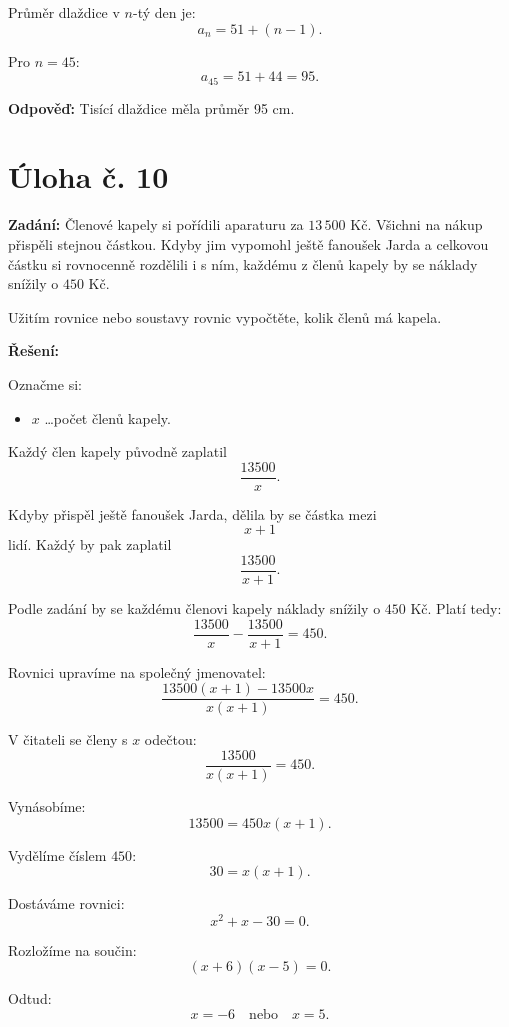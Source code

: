 \documentclass[12pt,a4paper]{article}
\begin{document}
\medskip

Průměr dlaždice v \(n\)-tý den je:
\[
a_n=51+(n-1).
\]

Pro \(n=45\):
\[
a_{45}=51+44=95.
\]

\bigskip

\textbf{Odpověď:}   
Tisící dlaždice měla průměr 95 cm.


\newpage
\section*{Úloha č. 10}

\textbf{Zadání:}  
Členové kapely si pořídili aparaturu za \(13\,500\) Kč. Všichni na nákup přispěli stejnou částkou. Kdyby jim vypomohl ještě fanoušek Jarda a celkovou částku si rovnocenně rozdělili i s ním, každému z členů kapely by se náklady snížily o \(450\) Kč.

Užitím rovnice nebo soustavy rovnic vypočtěte, kolik členů má kapela.

\bigskip

\textbf{Řešení:}

Označme si:
\begin{itemize}
    \item \(x\) \dots počet členů kapely.
\end{itemize}

Každý člen kapely původně zaplatil
\[
\frac{13500}{x}.
\]

Kdyby přispěl ještě fanoušek Jarda, dělila by se částka mezi
\[
x+1
\]
lidí. Každý by pak zaplatil
\[
\frac{13500}{x+1}.
\]

Podle zadání by se každému členovi kapely náklady snížily o \(450\) Kč. Platí tedy:
\[
\frac{13500}{x}-\frac{13500}{x+1}=450.
\]

\medskip

Rovnici upravíme na společný jmenovatel:
\[
\frac{13500(x+1)-13500x}{x(x+1)}=450.
\]

V čitateli se členy s \(x\) odečtou:
\[
\frac{13500}{x(x+1)}=450.
\]

Vynásobíme:
\[
13500=450x(x+1).
\]

Vydělíme číslem \(450\):
\[
30=x(x+1).
\]

Dostáváme rovnici:
\[
x^2+x-30=0.
\]

Rozložíme na součin:
\[
(x+6)(x-5)=0.
\]

Odtud:
\[
x=-6 \quad \text{nebo} \quad x=5.
\]
\end{document}
